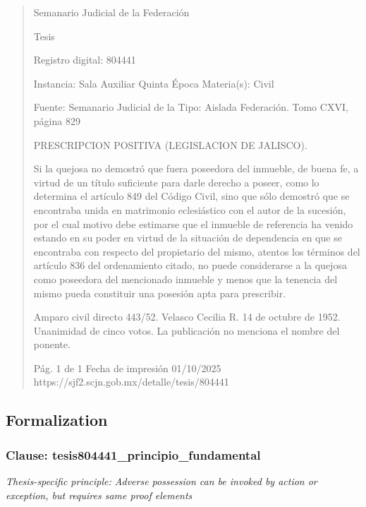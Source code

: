 \documentclass[11pt,a4paper]{article}
\begin{document}
\begin{quote}
                                                   Semanario Judicial de la Federación

                                                  Tesis

 Registro digital: 804441

 Instancia: Sala Auxiliar         Quinta Época                         Materia(s): Civil

                                  Fuente: Semanario Judicial de la     Tipo: Aislada
                                  Federación.
                                  Tomo CXVI, página 829


PRESCRIPCION POSITIVA (LEGISLACION DE JALISCO).


Si la quejosa no demostró que fuera poseedora del inmueble, de buena fe, a virtud de un título
suficiente para darle derecho a poseer, como lo determina el artículo 849 del Código Civil, sino que
sólo demostró que se encontraba unida en matrimonio eclesiástico con el autor de la sucesión, por
el cual motivo debe estimarse que el inmueble de referencia ha venido estando en su poder en
virtud de la situación de dependencia en que se encontraba con respecto del propietario del mismo,
atentos los términos del artículo 836 del ordenamiento citado, no puede considerarse a la quejosa
como poseedora del mencionado inmueble y menos que la tenencia del mismo pueda constituir una
posesión apta para prescribir.


Amparo civil directo 443/52. Velasco Cecilia R. 14 de octubre de 1952. Unanimidad de cinco votos.
La publicación no menciona el nombre del ponente.




                                             Pág. 1 de 1             Fecha de impresión 01/10/2025
  https://sjf2.scjn.gob.mx/detalle/tesis/804441

\end{quote}

\subsection{Formalization}

\subsubsection{Clause: tesis804441\_principio\_fundamental}

\textit{Thesis-specific principle: Adverse possession can be invoked by action or exception, but requires same proof elements}
\end{document}
